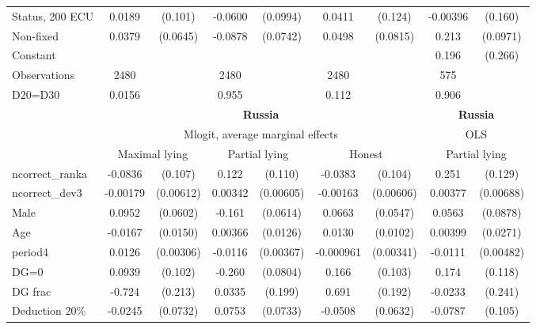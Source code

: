 \begin{tabular}{l|cccccc|cc}
Status, 200 ECU&   0.0189         &  (0.101)&  -0.0600         & (0.0994)&   0.0411         &  (0.124)& -0.00396         &  (0.160)\\
Non-fixed     &   0.0379         & (0.0645)&  -0.0878         & (0.0742)&   0.0498         & (0.0815)&    0.213\sym{**} & (0.0971)\\
Constant        &                  &         &                  &         &                  &         &    0.196         &  (0.266)\\
\hline
Observations    &     2480         &         &     2480         &         &     2480         &         &      575         &         \\
D20=D30         &   0.0156         &         &    0.955         &         &    0.112         &         &    0.906         &         \\
\hline\hline
&\multicolumn{6}{c|}{\bf Russia}&\multicolumn{2}{c}{\bf Russia}\\ &\multicolumn{6}{c|}{Mlogit, average marginal effects }&\multicolumn{2}{c}{OLS}\\
                &\multicolumn{2}{c}{Maximal lying}&\multicolumn{2}{c}{Partial lying}&\multicolumn{2}{c}{Honest}  &\multicolumn{2}{c}{Partial lying}\\
\hline
ncorrect\_ranka  &  -0.0836         &  (0.107)&    0.122         &  (0.110)&  -0.0383         &  (0.104)&    0.251\sym{*}  &  (0.129)\\
ncorrect\_dev3   & -0.00179         &(0.00612)&  0.00342         &(0.00605)& -0.00163         &(0.00606)&  0.00377         &(0.00688)\\
Male            &   0.0952         & (0.0602)&   -0.161\sym{***}& (0.0614)&   0.0663         & (0.0547)&   0.0563         & (0.0878)\\
Age             &  -0.0167         & (0.0150)&  0.00366         & (0.0126)&   0.0130         & (0.0102)&  0.00399         & (0.0271)\\
period4         &   0.0126\sym{***}&(0.00306)&  -0.0116\sym{***}&(0.00367)&-0.000961         &(0.00341)&  -0.0111\sym{**} &(0.00482)\\
DG=0          &   0.0939         &  (0.102)&   -0.260\sym{***}& (0.0804)&    0.166         &  (0.103)&    0.174         &  (0.118)\\
DG frac         &   -0.724\sym{***}&  (0.213)&   0.0335         &  (0.199)&    0.691\sym{***}&  (0.192)&  -0.0233         &  (0.241)\\
Deduction 20\%&  -0.0245         & (0.0732)&   0.0753         & (0.0733)&  -0.0508         & (0.0632)&  -0.0787         &  (0.105)\\

\end{tabular}
